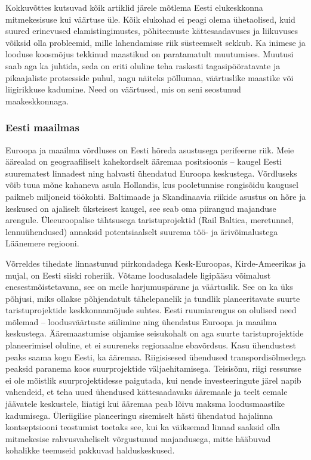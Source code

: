 \documentclass[estonian,]{article}
\begin{document}
Kokkuvõttes kutsuvad kõik artiklid järele mõtlema Eesti elukeskkonna mitmekesisuse kui väärtuse üle. Kõik elukohad ei peagi olema ühetaolised, kuid suured erinevused elamistingimustes, põhiteenuste kättesaadavuses ja liikuvuses võiksid olla probleemid, mille lahendamisse riik süsteemselt sekkub. Ka inimese ja looduse koosmõjus tekkinud maastikud on paratamatult muutumises. Muutusi saab aga ka juhtida, seda on eriti oluline teha raskesti tagasipööratavate ja pikaajaliste protsesside puhul, nagu näiteks põllumaa, väärtuslike maastike või liigirikkuse kadumine. Need on väärtused, mis on seni seostunud maakeskkonnaga.

\hypertarget{eesti-maailmas}{%
\subsubsection*{Eesti maailmas}\label{eesti-maailmas}}

Euroopa ja maailma võrdluses on Eesti hõreda asustusega perifeerne riik. Meie äärealad on geograafiliselt kahekordselt ääremaa positsioonis -- kaugel Eesti suurematest linnadest ning halvasti ühendatud Euroopa keskustega. Võrdluseks võib tuua mõne kahaneva asula Hollandis, kus pooletunnise rongisõidu kaugusel paikneb miljoneid töökohti. Baltimaade ja Skandinaavia riikide asustus on hõre ja keskused on ajaliselt üksteisest kaugel, see seab oma piirangud majanduse arengule. Üleeuroopalise tähtsusega taristuprojektid (Rail Baltica, meretunnel, lennuühendused) annaksid potentsiaalselt suurema töö- ja ärivõimalustega Läänemere regiooni.

Võrreldes tihedate linnastunud piirkondadega Kesk-Euroopas, Kirde-Ameerikas ja mujal, on Eesti siiski roheriik. Võtame loodusaladele ligipääsu võimalust enesestmõistetavana, see on meile harjumuspärane ja väärtuslik. See on ka üks põhjusi, miks ollakse põhjendatult tähelepanelik ja tundlik planeeritavate suurte taristuprojektide keskkonnamõjude suhtes. Eesti ruumiarengus on olulised need mõlemad -- loodusväärtuste säilimine ning ühendatus Euroopa ja maailma keskustega. Ääremaastumise ohjamise seisukohalt on aga suurte taristuprojektide planeerimisel oluline, et ei suureneks regionaalne ebavõrdsus. Kasu ühendustest peaks saama kogu Eesti, ka ääremaa. Riigisisesed ühendused transpordisõlmedega peaksid paranema koos suurprojektide väljaehitamisega. Teisisõnu, riigi ressursse ei ole mõistlik suurprojektidesse paigutada, kui nende investeeringute järel napib vahendeid, et teha uued ühendused kättesaadavaks ääremaale ja teelt eemale jäävatele keskustele, liiatigi kui ääremaa peab lõivu maksma loodusmaastike kadumisega. Üleriigilise planeeringu sisemiselt hästi ühendatud hajalinna kontseptsiooni teostumist toetaks see, kui ka väiksemad linnad saaksid olla mitmekesise rahvusvaheliselt võrgustunud majandusega, mitte hääbuvad kohalikke teenuseid pakkuvad halduskeskused.
\end{document}

